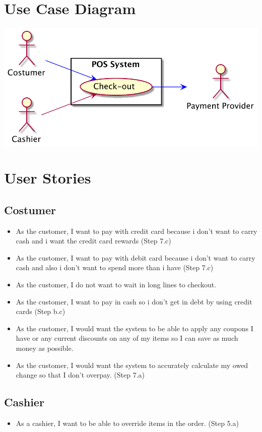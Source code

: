 \documentclass[12pt]{article}
\begin{document}
\section{Use Case Diagram}
\begin{center}
    \includegraphics[scale=0.53]{diagram.png}
\end{center}
\pagebreak

\section{User Stories}
\subsection{Costumer}
    \begin{itemize}
        \item As the customer, I want to pay with credit card because i don’t want 
        to carry cash and i want the credit card rewards (Step 7.c)
        \item As the customer, I want to pay with debit card because i don’t 
        want to carry cash and also i don’t want to spend 
        more than i have (Step 7.c)
        \item As the customer, I do not want to wait in long lines to checkout.
        \item As the customer, I want to pay in cash so i don’t get in 
        debt by using credit cards (Step b.c)
        \item As the customer, I would want the system to be able to apply any 
        coupons I have or any current discounts on any of my items 
        so I can save as much money as possible.
        \item As the customer, I would want the system to accurately 
        calculate my owed change so that I don’t overpay. (Step 7.a)
    \end{itemize}
\subsection{Cashier}
\begin{itemize}
    \item As a cashier, I want to be able to override items in 
    the order. (Step 5.a)
\end{itemize}
\end{document}
